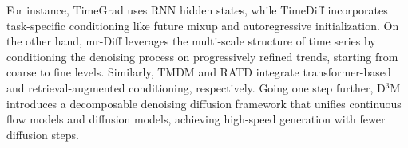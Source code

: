 \documentclass[a4paper,oneside,bibliography=totoc]{scrbook}
\begin{document}
For instance, TimeGrad \cite{rasul_autoregressive_2021} uses RNN hidden states, while TimeDiff \cite{shen_non-autoregressive_2023} incorporates task-specific conditioning like future mixup and autoregressive initialization.
On the other hand, mr-Diff \cite{shen_multi-resolution_2023} leverages the multi-scale structure of time series by conditioning the denoising process on progressively refined trends, starting from coarse to fine levels.
Similarly, TMDM \cite{li_transformer-modulated_2023} and RATD \cite{liu_retrieval-augmented_2024} integrate transformer-based and retrieval-augmented conditioning, respectively. %
Going one step further, D$^3$M \cite{yan_probabilistic_2024} introduces a decomposable denoising diffusion framework that unifies continuous flow models and diffusion models, achieving high-speed generation with fewer diffusion steps. %
\end{document}
